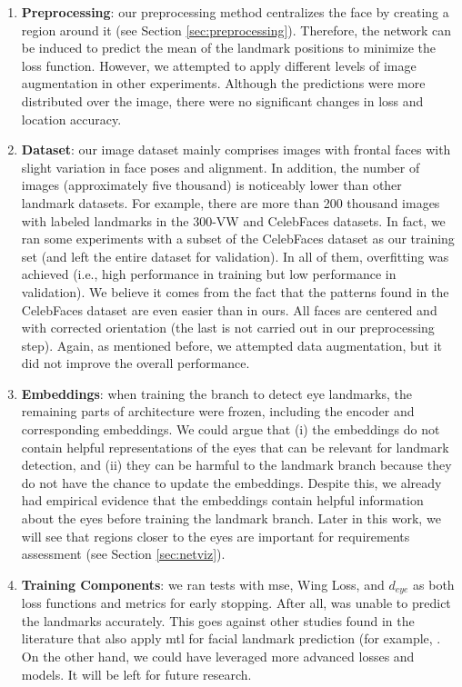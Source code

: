 \begin{enumerate}[i]
\item \textbf{Preprocessing}: our preprocessing method centralizes the face by creating a region around it (see Section \ref{sec:preprocessing}). Therefore, the network can be induced to predict the mean of the landmark positions to minimize the loss function. However, we attempted to apply different levels of image augmentation in other experiments. Although the predictions were more distributed over the image, there were no significant changes in loss and location accuracy.
 
\item \textbf{Dataset}: our \adhoc image dataset mainly comprises images with frontal faces with slight variation in face poses and alignment. In addition, the number of images (approximately five thousand) is noticeably lower than other landmark datasets. For example, there are more than 200 thousand images with labeled landmarks in the 300-VW \citep{tzimiropoulos2015project} and CelebFaces \citep{yang2015facial} datasets. In fact, we ran some experiments with a subset of the CelebFaces dataset as our training set (and left the entire \adhoc dataset for validation). In all of them, overfitting was achieved (i.e., high performance in training but low performance in validation). We believe it comes from the fact that the patterns found in the CelebFaces dataset are even easier than in ours. All faces are centered and with corrected orientation (the last is not carried out in our preprocessing step). Again, as mentioned before, we attempted data augmentation, but it did not improve the overall performance.
 
\item \textbf{Embeddings}: when training the branch to detect eye landmarks, the remaining parts of \methodname architecture were frozen, including the encoder and corresponding embeddings. We could argue that (i) the embeddings do not contain helpful representations of the eyes that can be relevant for landmark detection, and (ii) they can be harmful to the landmark branch because they do not have the chance to update the embeddings. Despite this, we already had empirical evidence that the embeddings contain helpful information about the eyes before training the landmark branch. Later in this work, we will see that regions closer to the eyes are important for requirements assessment (see Section \ref{sec:netviz}).
 
\item \textbf{Training Components}: we ran tests with \acs{mse}, Wing Loss, and $d_{eye}$ as both loss functions and metrics for early stopping. After all, \methodname was unable to predict the landmarks accurately. This goes against other studies found in the literature that also apply \acs{mtl} for facial landmark prediction (for example, \citep{zhang2014facial, ranjan2017hyperface, zhang2015learning}. On the other hand, we could have leveraged more advanced losses and models. It will be left for future research.
 
\end{enumerate}
 
